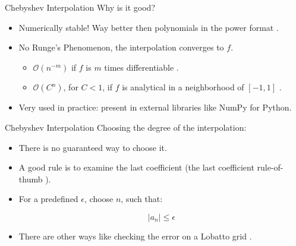 \documentclass{beamer}
\newcommand{\bigO}{\mathscr{O}}
\begin{document}
\begin{frame}{Chebyshev Interpolation}
		Why is it good?
	
	\begin{itemize}
		\item Numerically stable! Way better then polynomials in the power format \cite{gautschi:1979}.
		
		\item No Runge's Phenomenon, the interpolation converges to $f$.
		\begin{itemize}
			\item $\bigO(n^{-m})$ if $f$ is $m$ times differentiable \cite[p.~28]{gottlieb}.
			\item $\bigO(C^n)$, for $C<1$, if $f$ is analytical in a neighborhood of $[-1, 1]$ \cite{battles:2004}.
		\end{itemize}
		
		\item Very used in practice: present in external libraries like NumPy for Python.
	\end{itemize}
\end{frame}

\begin{frame}{Chebyshev Interpolation}
	Choosing the degree of the interpolation:
	
	\begin{itemize}
		\item There is no guaranteed way to choose it.
		\item A good rule is to examine the last coefficient (the last coefficient rule-of-thumb \cite[p~.50]{boyd:2001}).
		\item For a predefined $\epsilon$, choose $n$, such that:
		
		\begin{equation*}
		|a_n| \le \epsilon
		\end{equation*}
		
		\item There are other ways like checking the error on a Lobatto grid \cite{boyd:2007}.
	\end{itemize}
\end{frame}
\end{document}
